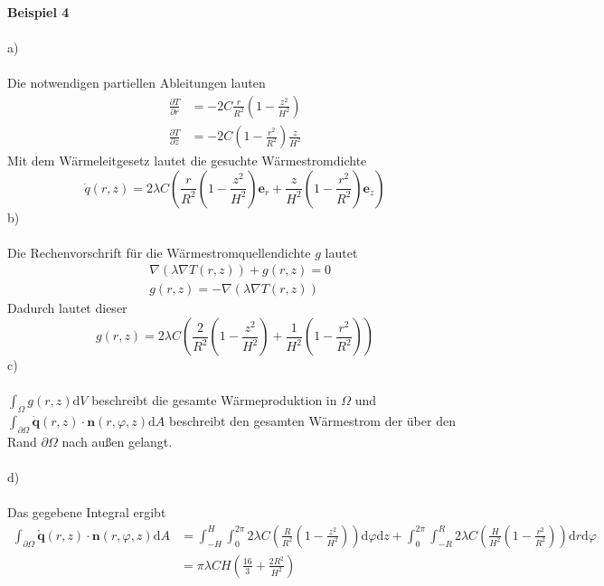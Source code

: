 \textbf{Beispiel 4}\\ \\
a)\\ \\
Die notwendigen partiellen Ableitungen lauten
\begin{align*}
	\frac{\partial T}{\partial r} &= -2C\frac{r}{R^2}\left(1 - \frac{z^2}{H^2}\right) \\
	\frac{\partial T}{\partial z} &= -2C\left(1 - \frac{r^2}{R^2}\right)\frac{z}{H^2}
\end{align*}
Mit dem Wärmeleitgesetz lautet die gesuchte Wärmestromdichte
\[
	\dot{q}(r,z) = 2\lambda C\left(\frac{r}{R^2}\left(1 - \frac{z^2}{H^2}\right)\textbf{e}_r + \frac{z}{H^2}\left(1 - \frac{r^2}{R^2}\right)\textbf{e}_z\right)
\]
b)\\ \\
Die Rechenvorschrift für die Wärmestromquellendichte $g$ lautet
\begin{align*}
	&\nabla\left(\lambda\nabla T(r,z)\right) + g(r,z) = 0 \\
	&g(r,z) = -\nabla\left(\lambda\nabla T(r,z)\right)
\end{align*}
Dadurch lautet dieser
\[
	g(r,z) = 2\lambda C\left(\frac{2}{R^2}\left(1 - \frac{z^2}{H^2}\right) + \frac{1}{H^2}\left(1 - \frac{r^2}{R^2}\right)\right)
\]
c)\\ \\
$\int_{\Omega}g(r,z) \text{d}V$ beschreibt die gesamte Wärmeproduktion in $\Omega$ und $\int_{\partial \Omega}\dot{\textbf{q}}(r,z)\cdot\textbf{n}(r,\varphi,z)\text{d}A$ beschreibt den gesamten Wärmestrom der über den Rand $\partial \Omega$ nach außen gelangt. \\ \\
d)\\ \\
Das gegebene Integral ergibt
\begin{align*}
	\int_{\partial \Omega}\dot{\textbf{q}}(r,z)\cdot\textbf{n}(r,\varphi,z)\text{d}A &= \int_{-H}^{H}\int_{0}^{2\pi}2\lambda C\left(\frac{R}{R^2}\left(1 - \frac{z^2}{H^2}\right)\right)\text{d}\varphi\text{d}z + \int_{0}^{2\pi}\int_{-R}^{R}2\lambda C\left(\frac{H}{H^2}\left(1 - \frac{r^2}{R^2}\right)\right)\text{d}r\text{d}\varphi \\
	&= \pi\lambda CH\left(\frac{16}{3} + \frac{2R^2}{H^2}\right)
\end{align*}